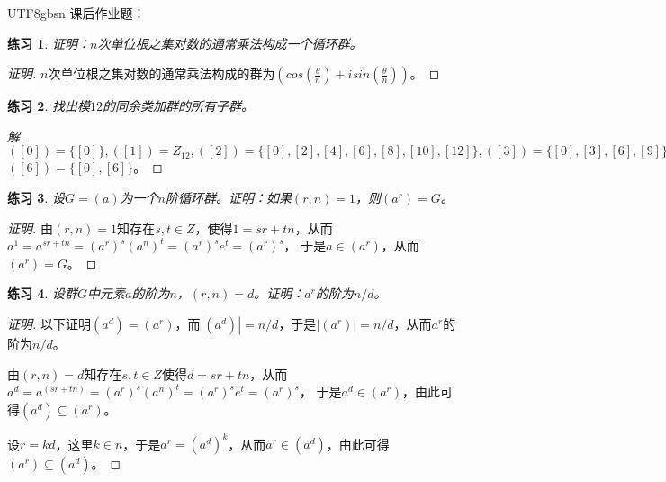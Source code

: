 \documentclass{article}
\newtheorem{Exercise}{练习}
\begin{document}
\begin{CJK*}{UTF8}{gbsn}
课后作业题：
\begin{Exercise}
证明：$n$次单位根之集对数的通常乘法构成一个循环群。
\end{Exercise}
\begin{proof}[证明]
  $n$次单位根之集对数的通常乘法构成的群为$(cos(\frac{\theta}{n})+isin(\frac{\theta}{n}))$。
\end{proof}
\begin{Exercise}
找出模$12$的同余类加群的所有子群。
\end{Exercise}
\begin{proof}[解]
  $([0])=\{[0]\},([1])=Z_{12},([2])=\{[0],[2],[4],[6],[8],[10],[12]\},([3])=\{[0],[3],[6],[9]\},([4])=\{[0],[4],[8]\},$
  $([6])=\{[0],[6]\}$。

\end{proof}
\begin{Exercise}
  设$G=(a)$为一个$n$阶循环群。证明：如果$(r,n)=1$，则$(a^r)=G$。
\end{Exercise}

\begin{proof}[证明]
  由$(r,n)=1$知存在$s,t\in Z$，使得$1=sr+tn$，从而$a^1=a^{sr+tn}=(a^r)^s(a^n)^t=(a^r)^se^t=(a^r)^s$，
  于是$a\in (a^r)$，从而$(a^r)=G$。
\end{proof}
\begin{Exercise}
  设群$G$中元素$a$的阶为$n$，$(r,n)=d$。证明：$a^r$的阶为$n/d$。
\end{Exercise}
\begin{proof}[证明]
  以下证明$(a^d)=(a^r)$，而$|(a^d)|=n/d$，于是$|(a^r)|=n/d$，从而$a^r$的阶为$n/d$。

  由$(r,n)=d$知存在$s,t\in Z$使得$d=sr+tn$，从而$a^d=a^{(sr+tn)}=(a^r)^s(a^n)^t=(a^r)^se^t=(a^r)^s$，
  于是$a^d\in (a^r)$，由此可得$(a^d)\subseteq (a^r)$。

  设$r=kd$，这里$k\in n$，于是$a^r=(a^d)^k$，从而$a^r\in (a^d)$，由此可得$(a^r)\subseteq (a^d)$。
\end{proof}
\end{CJK*}
\end{document}
